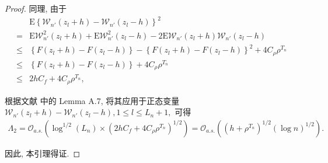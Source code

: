 \documentclass[a4paper,openay,14pt]{ctexbook}
\numberwithin{equation}{section}
\numberwithin{lem}{section}
\begin{document}
\begin{proof}
同理, 由于
\begin{align*}
    &\mathrm{E}\left\{\mathcal{W}_{n'}(z_l+h) - \mathcal{W}_{n'}(z_l-h)\right\}^2\\
    =&
    \mathrm{E} \mathcal{W}_{n'}^{2}(z_l+h)
    +\mathrm{E} \mathcal{W}_{n'}^{2}(z_l-h)
    -2\mathrm{E} \mathcal{W}_{n'}(z_l+h)\mathcal{W}_{n'}(z_l-h)\\
    \le &
    \left\{F(z_l+h) - F(z_l-h)\right\}
    - \left\{F(z_l+h) - F(z_l-h)\right\}^2
    +4C_{\rho}{\rho}^{T_n}\\
    \leq&
    \left\{F(z_l+h) - F(z_l-h)\right\}
    +4C_{\rho}{\rho}^{T_n}\\
    \leq &
    2hC_f+4C_{\rho}{\rho}^{T_n},
\end{align*}

根据文献\cite{wang2022oracle} 中的 Lemma A.7, 将其应用于正态变量
$\mathcal{W}_{n'}(z_l+h) - \mathcal{W}_{n'}(z_l-h), 1\le l\le L_n+1,$
可得
\begin{align*}
\Lambda_2
=
\mathcal{O}_{a.s.}\left(
\log^{1/2}(L_n)
\times
(2hC_f+4C_{\rho}{\rho}^{T_n})^{1/2}
\right)
=
\mathcal{O}_{a.s.}\left(
\left(h+\rho^{T_n}\right)^{1/2}
\left(\log n\right)^{1/2}
\right).
\end{align*}

因此, 本引理得证.

\end{proof}






\end{document}
